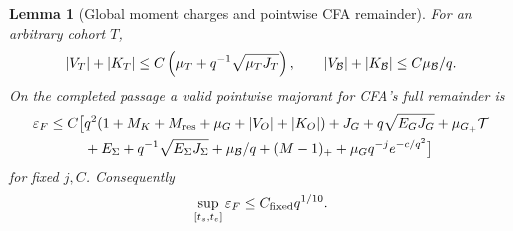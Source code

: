 \documentclass[11pt]{article}
\numberwithin{equation}{section}
\newtheorem{lemma}[theorem]{Lemma}\newtheorem{proposition}[theorem]{Proposition}
\theoremstyle{remark}\newtheorem{remark}[theorem]{Remark}
\newcommand{\Gp}{{G_+}}\newcommand{\eps}{\varepsilon}
\begin{document}
\begin{lemma}[Global moment charges and pointwise CFA remainder]
\label{an03srrv1:pointwise}
For an arbitrary cohort $T$,
\begin{equation}
 |V_T|+|K_T|\le C\left(\mu_T+q^{-1}\sqrt{\mu_TJ_T}\right),
 \qquad |V_\mathcal B|+|K_\mathcal B|\le C\mu_\mathcal B/q.
 \label{an03srrv1:momentcharge}
\end{equation}
On the completed passage a valid pointwise majorant for CFA's
full remainder is
\begin{align}
 \eps_F\le C\big[&q^2(1+M_K+M_{\rm res}+\mu_G+|V_O|+|K_O|)
 +J_G+q\sqrt{E_GJ_G}+\mu_\Gp\mathcal T\notag\\
 &+E_\Sigma+q^{-1}\sqrt{E_\Sigma J_\Sigma}
 +\mu_\BB/q+(M-1)_++\mu_Gq^{-j}e^{-c/q^2}\big]
 \label{an03srrv1:majorant}
\end{align}
for fixed $j,C$. Consequently
\begin{equation}
 \sup_{[t_s,t_e]}\eps_F\le C_{\rm fixed}q^{1/10}.
 \label{an03srrv1:epslate}
\end{equation}
\end{lemma}
\end{document}
